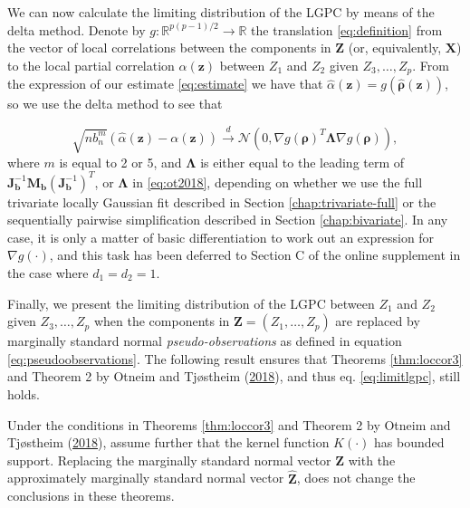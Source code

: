 \documentclass[
  12pt,
  letterpaper]{article}
\newcommand{\X}{\bm{X}}
\newcommand{\Z}{\bm{Z}}
\newcommand{\z}{\bm{z}}
\newcommand{\hZ}{\widehat{\bm{Z}}}
\newcommand{\frho}{\bm{\rho}}
\newcommand{\hfrho}{\widehat{\bm{\rho}}}
\newcommand{\hh}{\bm{b}}
\newcommand{\halpha}{\widehat{\alpha}}
\newcommand{\fLambda}{\bm{\Lambda}}
\newcommand{\Jb}{\bm{J}_{\hh}}
\newcommand{\Mb}{\bm{M}_{\hh}}
\theoremstyle{definition}
\theoremstyle{definition}
\theoremstyle{definition}
\theoremstyle{remark}
\let\BeginKnitrBlock\begin \let\EndKnitrBlock\end
\begin{document}
We can now calculate the limiting distribution of the LGPC by means of the delta method. Denote by \(g: \mathbb{R}^{p(p-1)/2} \rightarrow \mathbb{R}\) the translation \eqref{eq:definition} from the vector of local correlations between the components in \(\Z\) (or, equivalently, \(\X\)) to the local partial correlation \(\alpha(\z)\) between \(Z_1\) and \(Z_2\) given \(Z_3, \ldots, Z_p\). From the expression of our estimate \eqref{eq:estimate} we have that \(\halpha(\z) = g(\hfrho(\z))\), so we use the delta method to see that

\begin{equation}
\sqrt{nb_n^m}\left(\halpha(\z) - \alpha(\z)\right) \stackrel{d}{\rightarrow} \mathcal{N}\left(0, \nabla g(\frho)^T\fLambda\nabla g(\frho)\right),
\label{eq:limitlgpc}
\end{equation}
where \(m\) is equal to 2 or 5, and \(\fLambda\) is either equal to the leading term of \(\Jb^{-1}\Mb(\Jb^{-1})^T\), or \(\fLambda\) in \eqref{eq:ot2018}, depending on whether we use the full trivariate locally Gaussian fit described in Section \ref{chap:trivariate-full} or the sequentially pairwise simplification described in Section \ref{chap:bivariate}. In any case, it is only a matter of basic differentiation to work out an expression for \(\nabla g(\cdot)\), and this task has been deferred to Section C of the online supplement in the case where \(d_1 = d_2 = 1\).

Finally, we present the limiting distribution of the LGPC between \(Z_1\) and \(Z_2\) given \(Z_3, \ldots, Z_p\) when the components in \(\Z = (Z_1, \ldots, Z_p)\) are replaced by marginally standard normal \emph{pseudo-observations} as defined in equation \eqref{eq:pseudoobservations}. The following result ensures that Theorems \ref{thm:loccor3} and Theorem 2 by Otneim and Tjøstheim (\protect\hyperlink{ref-otneim2017conditional}{2018}), and thus eq. \eqref{eq:limitlgpc}, still holds.

\vspace{.5cm}

\BeginKnitrBlock{theorem}
\protect\hypertarget{thm:pseudo}{}{\label{thm:pseudo} }Under the conditions in Theorems \ref{thm:loccor3} and Theorem 2 by Otneim and Tjøstheim (\protect\hyperlink{ref-otneim2017conditional}{2018}), assume further that the kernel function \(K(\cdot)\) has bounded support. Replacing the marginally standard normal vector \(\Z\) with the approximately marginally standard normal vector \(\hZ\), does not change the conclusions in these theorems.
\EndKnitrBlock{theorem}
\end{document}
